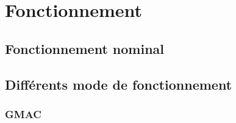 
\chapter{Fonctionnement}
\label{chap:fonctionnement}

\section{Fonctionnement nominal}

\section{Différents mode de fonctionnement}

\subsection{GMAC}



